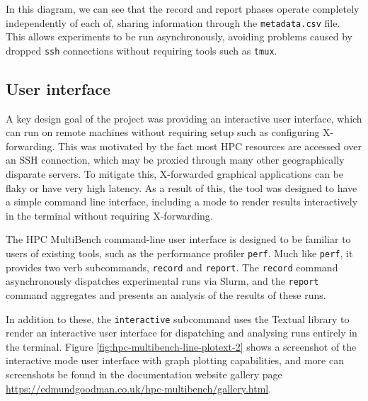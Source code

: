 In this diagram, we can see that the record and report phases operate completely independently of each of, sharing information through the \texttt{metadata.csv} file. This allows experiments to be run asynchronously, avoiding problems caused by dropped \texttt{ssh} connections without requiring tools such as \texttt{tmux}.

\subsection{User interface}
\label{ssec:hpc-multibench-ui}

A key design goal of the project was providing an interactive user interface, which can run on remote machines without requiring setup such as configuring X-forwarding. This was motivated by the fact most \acrshort{HPC} resources are accessed over an SSH connection, which may be proxied through many other geographically disparate servers. To mitigate this, X-forwarded graphical applications can be flaky or have very high latency. As a result of this, the tool was designed to have a simple command line interface, including a mode to render results interactively in the terminal without requiring X-forwarding.

The HPC MultiBench command-line user interface is designed to be familiar to users of existing tools, such as the performance profiler \texttt{perf}. Much like \texttt{perf}, it provides two verb subcommands, \texttt{record} and \texttt{report}. The \texttt{record} command asynchronously dispatches experimental runs via Slurm, and the \texttt{report} command aggregates and presents an analysis of the results of these runs.

In addition to these, the \texttt{interactive} subcommand uses the Textual \cite{TextualizeTextual2024} library to render an interactive user interface for dispatching and analysing runs entirely in the terminal. Figure \ref{fig:hpc-multibench-line-plotext-2} shows a screenshot of the interactive mode user interface with graph plotting capabilities, and more can screenshots be found in the documentation website gallery page \url{https://edmundgoodman.co.uk/hpc-multibench/gallery.html}.

